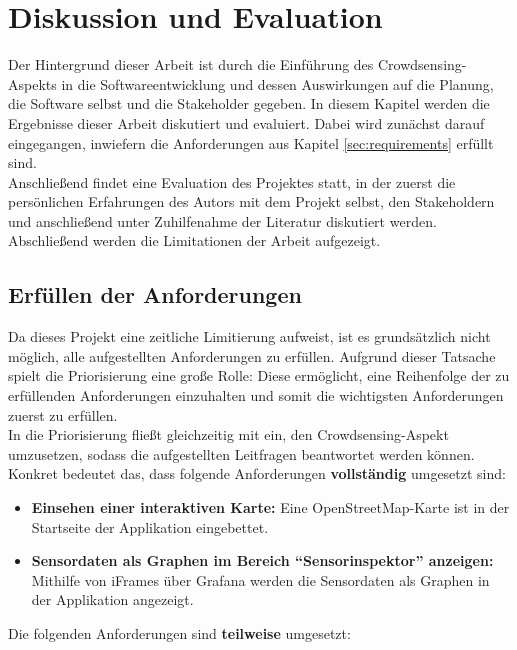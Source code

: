 \chapter{Diskussion und Evaluation}
Der Hintergrund dieser Arbeit ist durch die Einführung des Crowd\-sen\-sing-Aspekts in die Softwareentwicklung und dessen Auswirkungen auf die Planung, die Software selbst und die Stakeholder gegeben. In diesem Kapitel werden die Ergebnisse dieser Arbeit diskutiert und evaluiert. Dabei wird zunächst darauf eingegangen, inwiefern die Anforderungen aus Kapitel \ref{sec:requirements} erfüllt sind. \\ Anschließend findet eine Evaluation des Projektes statt, in der zuerst die persönlichen Erfahrungen des Autors mit dem Projekt selbst, den Stakeholdern und anschließend unter Zuhilfenahme der Literatur diskutiert werden. Abschließend werden die Limitationen der Arbeit aufgezeigt.
\label{sec:discussion}

\section{Erfüllen der Anforderungen}
\label{sec:requirements_evaluation}
Da dieses Projekt eine zeitliche Limitierung aufweist, ist es grundsätzlich nicht möglich, alle aufgestellten Anforderungen zu erfüllen. Aufgrund dieser Tatsache spielt die Priorisierung eine große Rolle: Diese ermöglicht, eine Reihenfolge der zu erfüllenden Anforderungen einzuhalten und somit die wichtigsten Anforderungen zuerst zu erfüllen. \\ In die Priorisierung fließt gleichzeitig mit ein, den Crowdsensing-Aspekt umzusetzen, sodass die aufgestellten Leitfragen beantwortet werden können. Konkret bedeutet das, dass folgende Anforderungen \textbf{vollständig} umgesetzt sind:

\begin{itemize}
    \item \textbf{Einsehen einer interaktiven Karte:} Eine OpenStreetMap-Karte ist in der Startseite der Applikation eingebettet.
    \item \textbf{Sensordaten als Graphen im Bereich \enquote{Sensorinspektor} anzeigen:} Mithilfe von iFrames über Grafana werden die Sensordaten als Graphen in der Applikation angezeigt.
\end{itemize}

Die folgenden Anforderungen sind \textbf{teilweise} umgesetzt:

